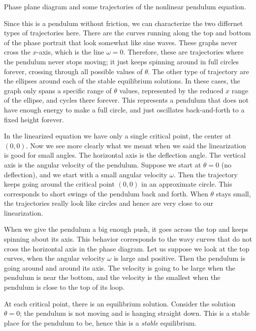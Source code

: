 \begin{myfig}
\capstart
{}
\caption{Phase plane diagram and some trajectories of
the nonlinear pendulum equation. \label{fig:nlin-pend-phasediag}}
\end{myfig}

Since this is a pendulum without friction, we can characterize the two differnet types of trajectories here. There are the curves running along the top and bottom of the phase portrait that look somewhat like sine waves. These graphs never cross the $x$-axis, which is the line $\omega = 0$. Therefore, these are trajectories where the pendulum never stops moving; it just keeps spinning around in full circles forever, crossing through all possible values of $\theta$. The other type of trajectory are the ellipses around each of the stable equilibrium solutions. In these cases, the graph only spans a specific range of $\theta$ values, represented by the reduced $x$ range of the ellipse, and cycles there forever. This represents a pendulum that does not have enough energy to make a full circle, and just oscillates back-and-forth to a fixed height forever.

In the linearized equation we have only a single critical point, the center
at $(0,0)$.  Now we see more clearly what we meant when we said the
linearization is good for small angles.  The horizontal axis is the
deflection angle.  The vertical axis is the angular velocity of the
pendulum.  Suppose we start at $\theta = 0$ (no deflection), and
we start with a small angular velocity $\omega$.  Then the trajectory keeps going
around the critical point $(0,0)$ in an approximate circle.  This
corresponds to short swings of the pendulum back and forth.  When $\theta$
stays small, the trajectories really look like circles and hence are very
close to our linearization.

When we give the pendulum a big enough push, it
goes across the top and keeps spinning about its axis.  This behavior
corresponds to the
wavy curves that do not cross the horizontal axis in the phase diagram.
Let us suppose we look at the top curves, when the angular velocity $\omega$
is large and positive.  Then the pendulum is going
around and around its axis.  The velocity is going to
be large when the pendulum is near the bottom, and the velocity is the
smallest when the pendulum
is close to the top of its loop.

At each critical point, there is an equilibrium solution.  Consider
the solution
$\theta = 0$;  the pendulum is not moving
and is hanging straight down.  This is a stable place for the
pendulum to be, hence this is a \emph{stable} equilibrium.


